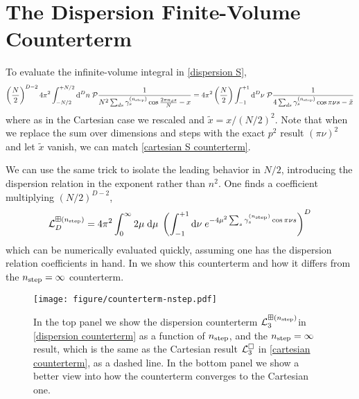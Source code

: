 \section{The Dispersion \Luscher Finite-Volume Counterterm}\label{sec:counterterm/dispersion}

To evaluate the infinite-volume integral in \eqref{dispersion S},
\begin{equation}
    \left(\frac{N}{2}\right)^{D-2}
    4\pi^2 \int_{-N/2}^{+N/2} \mathrm{d}^Dn\; \mathcal{P} \frac{1}{N^2 \sum_{ds} \gamma^{({n_\text{step}})}_s \cos \frac{2\pi n_d s}{N} - x}
    =
    4\pi^2 \left(\frac{N}{2}\right) \int_{-1}^{+1} \mathrm{d}^D\nu\; \mathcal{P} \frac{1}{4\sum_{ds} \gamma^{({n_\text{step}})}_s \cos \pi \nu s - \tilde{x}}
\end{equation}
where as in the Cartesian case we rescaled and $\tilde{x} = x/(N/2)^2$.
Note that when we replace the sum over dimensions and steps with the exact $p^2$ result $(\pi \nu)^2$ and let $\tilde{x}$ vanish, we can match \eqref{cartesian S counterterm}.

We can use the same trick to isolate the leading behavior in $N/2$, introducing the dispersion relation in the exponent rather than $n^2$.
One finds a coefficient multiplying $(N/2)^{D-2}$,
\begin{equation}
    \label{eq:dispersion counterterm}
    \mathcal{L}^{\boxplus ({n_\text{step}})}_D = 4 \pi^2 \int_{0}^{\infty} 2\mu\; \mathrm{d}\mu\; \left(\int_{-1}^{+1} \mathrm{d}\nu\; e^{-4\mu^2 \sum_s \gamma_s^{({n_\text{step}})} \cos \pi \nu s}\right)^D
\end{equation}
which can be numerically evaluated quickly, assuming one has the dispersion relation coefficients in hand.
In  we show this counterterm and how it differs from the ${n_\text{step}}=\infty$ counterterm.

\begin{figure}
    \texttt{[image: figure/counterterm-nstep.pdf]}
    \caption{In the top panel we show the dispersion counterterm $\mathcal{L}^{\boxplus ({n_\text{step}})}_{3}$in \eqref{dispersion counterterm} as a function of ${n_\text{step}}$, and the ${n_\text{step}}=\infty$ result, which is the same as the Cartesian result $\mathcal{L}^{\square}_3$ in \eqref{cartesian counterterm}, as a dashed line.  In the bottom panel we show a better view into how the counterterm converges to the Cartesian one.
    }
    \label{fig:nstep counterterm}
\end{figure}
